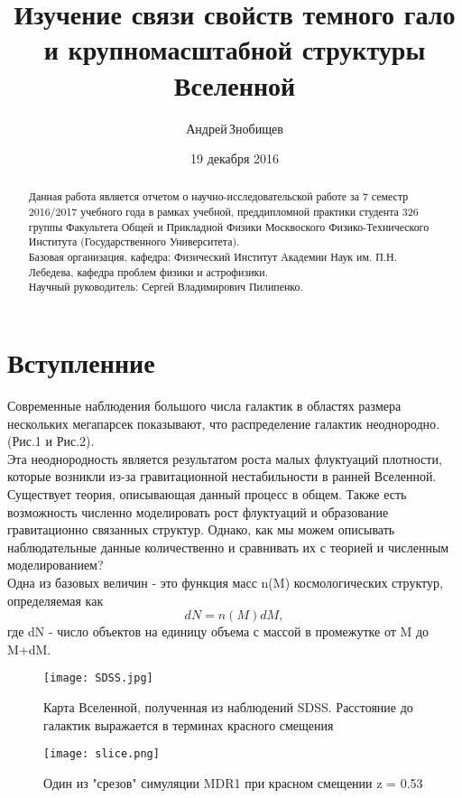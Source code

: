 \documentclass[11pt]{article}
\title{Изучение связи свойств темного гало и крупномасштабной структуры Вселенной}
\author{Андрей\,Знобищев}
\date{19 декабря 2016}
\begin{document}
\maketitle

\begin{abstract}
	Данная работа является отчетом о научно-исследовательской работе за 7 семестр 2016/2017 учебного года в рамках учебной, преддипломной практики студента 326 группы Факультета Общей и Прикладной Физики Москвоского Физико-Технического Института (Государственного Университета). \\ 
	Базовая организация, кафедра: Физический Институт Академии Наук им. П.Н. Лебедева, кафедра проблем физики и астрофизики.
\\
	Научный руководитель: Сергей Владимирович Пилипенко. 
\end{abstract}

\section{Вступленние}
Современные наблюдения большого числа галактик в областях размера нескольких мегапарсек показывают, что распределение галактик неоднородно. (Рис.1 и Рис.2). \\
Эта неоднородность является результатом роста малых флуктуаций плотности, которые возникли из-за гравитационной нестабильности в ранней Вселенной. Существует теория, описывающая данный процесс в общем. Также есть возможность численно моделировать рост флуктуаций и образование гравитационно связанных структур. Однако, как мы можем описывать наблюдательные данные количественно и сравнивать их с теорией и численным моделированием? \\
Одна из базовых величин - это функция масс n(M) космологических структур, определяемая как\\
\begin{equation}
	dN = n(M)dM,
\end{equation}
где dN - число объектов на единицу объема с массой в промежутке от M до M+dM. 
 
\begin{figure}[h]
\centering
\texttt{[image: SDSS.jpg]}
\caption{Карта Вселенной, полученная из наблюдений SDSS. Расстояние до галактик выражается в терминах красного смещения}
\end{figure}
\begin{figure}[H]
\centering
\texttt{[image: slice.png]}
\caption{Один из "срезов" симуляции MDR1 при красном смещении z = 0.53 }  
\end{figure}
\end{document}
